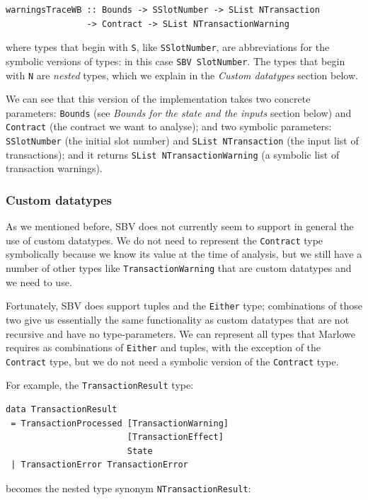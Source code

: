 \documentclass[runningheads]{llncs}
\begin{document}
\begin{verbatim}
warningsTraceWB :: Bounds -> SSlotNumber -> SList NTransaction
                -> Contract -> SList NTransactionWarning
\end{verbatim}

\noindent
where types that begin with \texttt{S}, like \texttt{SSlotNumber}, are abbreviations for the symbolic versions of types: in this case \texttt{SBV SlotNumber}.
The types that begin with \texttt{N} are \textit{nested} types, which we explain in the \textit{Custom datatypes} section below.

We can see that this version of the implementation takes two concrete parameters: \texttt{Bounds} (see \textit{Bounds for the state and the inputs} section below) and \texttt{Contract} (the contract we want to analyse); and two symbolic parameters: \texttt{SSlotNumber} (the initial slot number) and \texttt{SList NTransaction} (the input list of transactions); and it returns \texttt{SList NTransactionWarning} (a symbolic list of transaction warnings).

\subsubsection{Custom datatypes}

As we mentioned before, SBV does not currently seem to support in general the use of custom datatypes. We do not need to represent the \texttt{Contract} type symbolically because we know its value at the time of analysis, but we still have a number of other types like \texttt{TransactionWarning} that are custom datatypes and we need to use.

Fortunately, SBV does support tuples and the \texttt{Either} type; combinations of those two give us essentially the same functionality as custom datatypes that are not recursive and have no type-parameters. We can represent all types that Marlowe requires as combinations of \texttt{Either} and tuples, with the exception of the \texttt{Contract} type, but we do not need a symbolic version of the \texttt{Contract} type.

\noindent
For example, the \texttt{TransactionResult} type:
\begin{verbatim}
data TransactionResult
 = TransactionProcessed [TransactionWarning]
                        [TransactionEffect]
                        State
 | TransactionError TransactionError
\end{verbatim}
\noindent
becomes the nested type synonym \texttt{NTransactionResult}:
\end{document}
